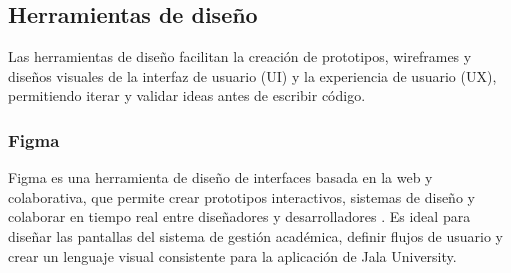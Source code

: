 \subsection{Herramientas de diseño}
Las herramientas de diseño facilitan la creación de prototipos, wireframes y diseños visuales de la interfaz de usuario (UI) y la experiencia de usuario (UX), permitiendo iterar y validar ideas antes de escribir código.

\subsubsection{Figma}
Figma es una herramienta de diseño de interfaces basada en la web y colaborativa, que permite crear prototipos interactivos, sistemas de diseño y colaborar en tiempo real entre diseñadores y desarrolladores \parencite{Figma}.
Es ideal para diseñar las pantallas del sistema de gestión académica, definir flujos de usuario y crear un lenguaje visual consistente para la aplicación de Jala University.
